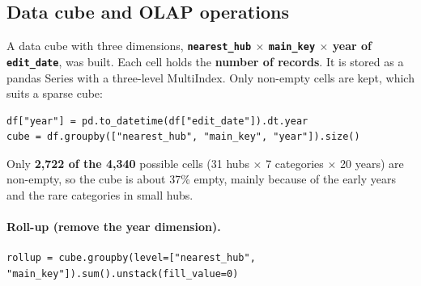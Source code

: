\documentclass[11pt,a4paper]{article}
\newcommand{\col}[1]{\texttt{#1}}
\begin{document}
\subsection{Data cube and OLAP operations}

A data cube with three dimensions, \textbf{\col{nearest\_hub} $\times$ \col{main\_key}
$\times$ year of \col{edit\_date}}, was built. Each cell holds the \textbf{number of records}.
It is stored as a pandas Series with a three-level MultiIndex. Only non-empty cells are kept,
which suits a sparse cube:

\begin{lstlisting}
df["year"] = pd.to_datetime(df["edit_date"]).dt.year
cube = df.groupby(["nearest_hub", "main_key", "year"]).size()
\end{lstlisting}

Only \textbf{2{,}722 of the 4{,}340} possible cells (31 hubs $\times$ 7 categories $\times$ 20
years) are non-empty, so the cube is about 37\% empty, mainly because of the early years and
the rare categories in small hubs.

\paragraph{Roll-up (remove the year dimension).}
\begin{lstlisting}
rollup = cube.groupby(level=["nearest_hub", "main_key"]).sum().unstack(fill_value=0)
\end{lstlisting}
\end{document}
